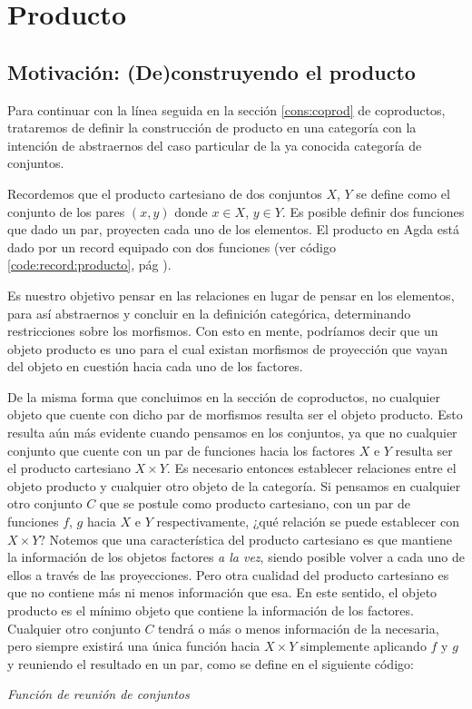 \section{Producto}\label{cons:prod}

\subsection{Motivación: (De)construyendo el producto}
\label{cons:prod:motivacion}
Para continuar con la línea seguida en la sección \ref{cons:coprod} de coproductos, trataremos de definir la construcción de producto en una categoría con la intención de abstraernos del caso particular de la ya conocida categoría de conjuntos.

Recordemos que el producto cartesiano de dos conjuntos $X$, $Y$ se define como el conjunto de los pares $(x,y)$ donde $x \in X$, $y \in Y$. Es posible definir dos funciones que dado un par, proyecten cada uno de los elementos. El producto en Agda está dado por un record equipado con dos funciones (ver código \ref{code:record:producto}, pág \pageref{code:record:producto}).

Es nuestro objetivo pensar en las relaciones en lugar de pensar en los elementos, para así abstraernos y concluir en la definición categórica, determinando restricciones sobre los morfismos. Con esto en mente, podríamos decir que un objeto producto es uno para el cual existan morfismos de proyección que vayan del objeto en cuestión hacia cada uno de los factores.

De la misma forma que concluimos en la sección de coproductos, no cualquier objeto que cuente con dicho par de morfismos resulta ser el objeto producto. Esto resulta aún más evidente cuando pensamos en los conjuntos, ya que no cualquier conjunto que cuente con un par de funciones hacia los factores $X$ e $Y$ resulta ser el producto cartesiano $X \times Y$. Es necesario entonces establecer relaciones entre el objeto producto y cualquier otro objeto de la categoría.
Si pensamos en cualquier otro conjunto $C$ que se postule como producto cartesiano, con un par de funciones $f$, $g$ hacia $X$ e $Y$ respectivamente, ¿qué relación se puede establecer con $X\times Y$?
Notemos que una característica del producto cartesiano es que mantiene la información de los objetos factores {\it a la vez}, siendo posible volver a cada uno de ellos a través de las proyecciones. Pero otra cualidad del producto cartesiano es que no contiene más ni menos información que esa. 
En este sentido, el objeto producto es el mínimo objeto que contiene la información de los factores.\\
Cualquier otro conjunto $C$ tendrá o más o menos información de la necesaria, pero siempre existirá una única función hacia $X \times Y$ simplemente aplicando $f$ y $g$ y reuniendo el resultado en un par, como se define en el siguiente código:
\begin{agdacode}{\it Función de reunión de conjuntos}

\end{agdacode}

